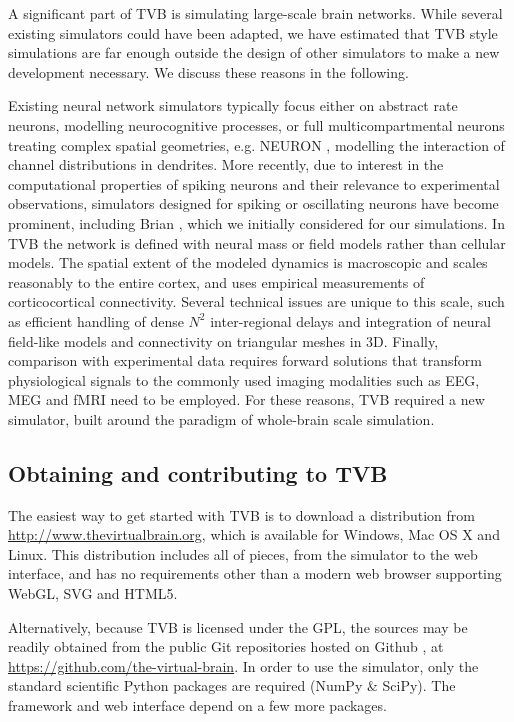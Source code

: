 \documentclass{bioinfo}
\begin{document}
A significant part of TVB is simulating large-scale brain networks. While
several existing simulators could have been adapted, we have estimated that
TVB style simulations are far enough outside the design of other simulators to
make a new development necessary. We discuss these reasons in the following. 

Existing neural network simulators typically focus either on abstract rate neurons, 
modelling  neurocognitive processes, or 
full multicompartmental neurons treating complex spatial
geometries, e.g. NEURON \citep{Hines_2001}, modelling the interaction of 
channel distributions in dendrites.  More recently, due to interest in
the computational properties of spiking neurons and their relevance to
experimental observations, simulators designed for spiking or oscillating neurons
have become prominent, including Brian \citep{Goodman_2009}, which we initially 
considered for our simulations.
In TVB the network is defined with neural mass or field
models \citep{Deco_2008a, Coombes_2010} rather than cellular models. The
spatial extent of the modeled dynamics is macroscopic and scales reasonably 
to the entire cortex, and uses empirical measurements of corticocortical
connectivity. Several technical issues are unique to this scale, such
as efficient handling of dense $N^2$ inter-regional delays and integration
of neural field-like models and connectivity on triangular meshes in 3D.
Finally, comparison with experimental data requires forward solutions
that transform physiological signals to the commonly
used imaging modalities such as EEG, MEG and fMRI need to be employed.
For these reasons, TVB required a new simulator, built around the paradigm
of whole-brain scale simulation.

\subsection{Obtaining and contributing to TVB}

The easiest way to get started with TVB is to download a distribution
from \url{http://www.thevirtualbrain.org}, which is available for Windows,
Mac OS X and Linux. This distribution includes
all of pieces, from the simulator to the web interface, and has no
requirements other than a modern web browser supporting WebGL, SVG and
HTML5.

Alternatively, because TVB is licensed under the GPL, the sources may be
readily obtained from the public Git repositories hosted on Github
\citep{dabbish2012social}, at 
\url{https://github.com/the-virtual-brain}. In order to use the simulator, 
only the standard scientific Python packages are required (NumPy \& SciPy).
The framework and web interface depend on a few more packages. 
\end{document}
